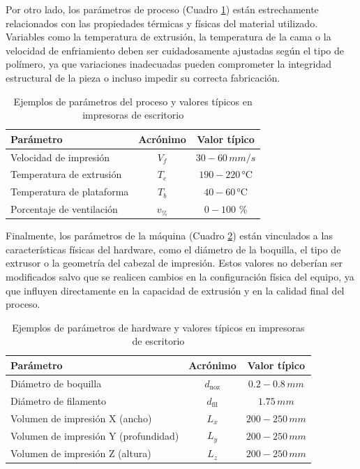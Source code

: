 Por otro lado, los parámetros de proceso (Cuadro \ref{tab:param-proceso}) están estrechamente relacionados con las propiedades térmicas y físicas del material utilizado. Variables como la temperatura de extrusión, la temperatura de la cama o la velocidad de enfriamiento deben ser cuidadosamente ajustadas según el tipo de polímero, ya que variaciones inadecuadas pueden comprometer la integridad estructural de la pieza o incluso impedir su correcta fabricación.

\begin{table}[ht]
  \centering
  \caption{Ejemplos de parámetros del proceso y valores típicos en impresoras de escritorio}
  \label{tab:param-proceso}
  \begin{tabular}{@{} l c c @{}}
    \toprule
    Parámetro                         & Acrónimo  & Valor típico  \\
    \midrule
    Velocidad de impresión            & $V_{f}$ &    $\mathrm{30-60}\,mm/s$  \\
    Temperatura de extrusión          & $T_{e}$  &    $\mathrm{190-220}\, \si{\celsius}$\\
    Temperatura de plataforma         & $T_{b}$   & $\mathrm{40-60}\, \si{\celsius}$ \\
    Porcentaje de ventilación         & $v_{\%}$ & $\mathrm{0-100}$ $\%$\\
    \bottomrule
  \end{tabular}
\end{table}

Finalmente, los parámetros de la máquina (Cuadro \ref{tab:param-hardware}) están vinculados a las características físicas del hardware, como el diámetro de la boquilla, el tipo de extrusor o la geometría del cabezal de impresión. Estos valores no deberían ser modificados salvo que se realicen cambios en la configuración física del equipo, ya que influyen directamente en la capacidad de extrusión y en la calidad final del proceso.

\begin{table}[ht]
  \centering
  \caption{Ejemplos de parámetros de hardware y valores típicos en impresoras de escritorio}
  \label{tab:param-hardware}
  \begin{tabular}{@{} l c c@{}}
    \toprule
    Parámetro                                   & Acrónimo & Valor típico  \\
    \midrule
    Diámetro de boquilla                        & $d_{\mathrm{noz}}$ &  $\mathrm{0.2-0.8}\,mm$ \\
    Diámetro de filamento                       & $d_{\mathrm{fil}}$ & $\mathrm{1.75}\,mm$ \\
    Volumen de impresión X (ancho)              & $L_{x}$   & $\mathrm{200-250}\,mm$\\
    Volumen de impresión Y (profundidad)        & $L_{y}$   & $\mathrm{200-250}\,mm$ \\
    Volumen de impresión Z (altura)             & $L_{z}$   & $\mathrm{200-250}\,mm$ \\
    \bottomrule
  \end{tabular}
\end{table}

